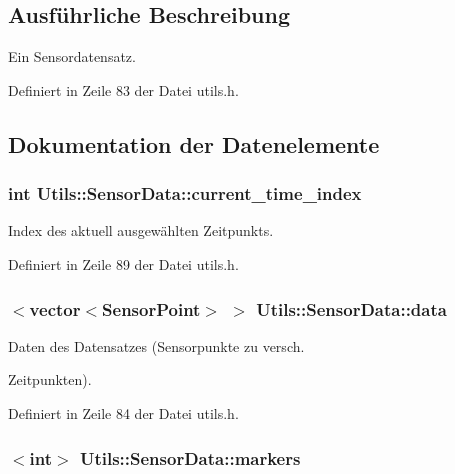 \subsection{Ausführliche Beschreibung}
Ein Sensordatensatz. 

Definiert in Zeile 83 der Datei utils.\-h.



\subsection{Dokumentation der Datenelemente}
\hypertarget{structUtils_1_1SensorData_a177d53154d56fcf1962f969ece1e7d9d}{
\subsubsection[{current\-\_\-time\-\_\-index}]{\setlength{\rightskip}{0pt plus 5cm}int Utils\-::\-Sensor\-Data\-::current\-\_\-time\-\_\-index}}\label{structUtils_1_1SensorData_a177d53154d56fcf1962f969ece1e7d9d}


Index des aktuell ausgewählten Zeitpunkts. 



Definiert in Zeile 89 der Datei utils.\-h.

\hypertarget{structUtils_1_1SensorData_ae94e7645dc0b6adfd21571b0abd5e309}{
\subsubsection[{data}]{$<${\bf vector}$<${\bf Sensor\-Point}$>$ $>$ Utils\-::\-Sensor\-Data\-::data}}\label{structUtils_1_1SensorData_ae94e7645dc0b6adfd21571b0abd5e309}


Daten des Datensatzes (Sensorpunkte zu versch. 

Zeitpunkten). 

Definiert in Zeile 84 der Datei utils.\-h.

\hypertarget{structUtils_1_1SensorData_ac2d7e037f39affd6ad9d4aa29ed579da}{
\subsubsection[{markers}]{$<$int$>$ Utils\-::\-Sensor\-Data\-::markers}}\label{structUtils_1_1SensorData_ac2d7e037f39affd6ad9d4aa29ed579da}



